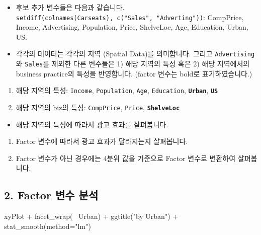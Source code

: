 \documentclass[a4paper]{article}
\newenvironment{Shaded}{}{}
\newcommand{\KeywordTok}[1]{\textcolor[rgb]{0.00,0.00,1.00}{#1}}
\newcommand{\DataTypeTok}[1]{#1}
\newcommand{\StringTok}[1]{\textcolor[rgb]{0.00,0.50,0.50}{#1}}
\newcommand{\OperatorTok}[1]{#1}
\newcommand{\NormalTok}[1]{#1}
\providecommand{\tightlist}{%
  \setlength{\itemsep}{0pt}\setlength{\parskip}{0pt}}
\begin{document}
\begin{itemize}
\tightlist
\item
  후보 추가 변수들은 다음과 같습니다.
  \texttt{setdiff(colnames(Carseats),\ c("Sales",\ "Adverting"))}:
  CompPrice, Income, Advertising, Population, Price, ShelveLoc, Age,
  Education, Urban, US.\\
\item
  각각의 데이터는 각각의 지역 (Spatial Data)를 의미합니다. 그리고
  \texttt{Advertising}와 \texttt{Sales}를 제외한 다른 변수들은 1) 해당
  지역의 특성 혹은 2) 해당 지역에서의 business practice의 특성을
  반영합니다. (factor 변수는 bold로 표기하였습니다.)\\
\end{itemize}

\begin{enumerate}
\def\labelenumi{\arabic{enumi}.}
\tightlist
\item
  해당 지역의 특성: \texttt{Income}, \texttt{Population}, \texttt{Age},
  \texttt{Education}, \textbf{\texttt{Urban}}, \textbf{\texttt{US}}\\
\item
  해당 지역의 biz의 특성: \texttt{CompPrice}, \texttt{Price},
  \textbf{\texttt{ShelveLoc}}
\end{enumerate}

\begin{itemize}
\tightlist
\item
  해당 지역의 특성에 따라서 광고 효과를 살펴봅니다.\\
\end{itemize}

\begin{enumerate}
\def\labelenumi{\arabic{enumi}.}
\tightlist
\item
  Factor 변수에 따라서 광고 효과가 달라지는지 살펴봅니다.\\
\item
  Factor 변수가 아닌 경우에는 4분위 값을 기준으로 Factor 변수로 변환하여
  살펴봅니다.
\end{enumerate}

\subsection{2. Factor 변수 분석}\label{factor--}

\begin{Shaded}
\begin{Highlighting}[]
\NormalTok{xyPlot }\OperatorTok{+}\StringTok{ }\KeywordTok{facet_wrap}\NormalTok{(}\OperatorTok{~}\StringTok{ }\NormalTok{Urban) }\OperatorTok{+}\StringTok{ }\KeywordTok{ggtitle}\NormalTok{(}\StringTok{"by Urban"}\NormalTok{) }\OperatorTok{+}\StringTok{ }\KeywordTok{stat_smooth}\NormalTok{(}\DataTypeTok{method=}\StringTok{"lm"}\NormalTok{)}
\end{Highlighting}
\end{Shaded}
\end{document}
